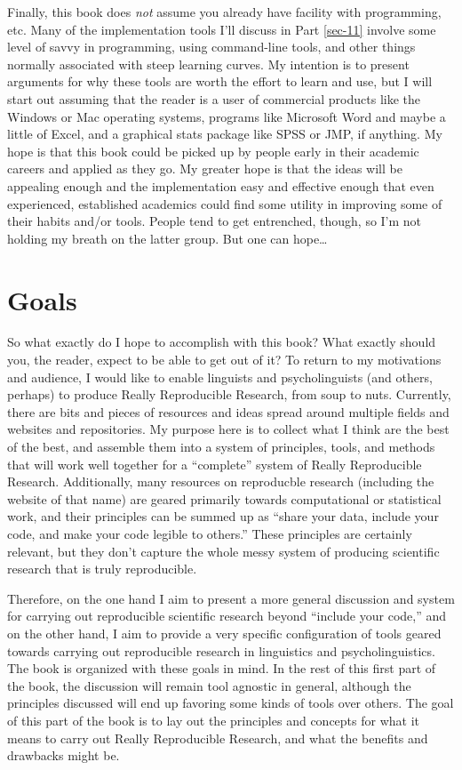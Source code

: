 \documentclass{book}
\begin{document}
Finally, this book does \emph{not} assume you already have facility with programming, etc. Many of the implementation tools I'll discuss in Part \ref{sec-11} involve some level of savvy in programming, using command-line tools, and other things normally associated with steep learning curves. My intention is to present arguments for why these tools are worth the effort to learn and use, but I will start out assuming that the reader is a user of commercial products like the Windows or Mac operating systems, programs like Microsoft Word and maybe a little of Excel, and a graphical stats package like SPSS or JMP, if anything.  My hope is that this book could be picked up by people early in their academic careers and applied as they go. My greater hope is that the ideas will be appealing enough and the implementation easy and effective enough that even experienced, established academics could find some utility in improving some of their habits and/or tools.  People tend to get entrenched, though, so I'm not holding my breath on the latter group.  But one can hope\ldots{}
\section{Goals}
\label{sec-2-5}

So what exactly do I hope to accomplish with this book?  What exactly should you, the reader, expect to be able to get out of it?  To return to my motivations and audience, I would like to enable linguists and psycholinguists (and others, perhaps) to produce Really Reproducible Research, from soup to nuts.  Currently, there are bits and pieces of resources and ideas spread around multiple fields and websites and repositories. My purpose here is to collect what I think are the best of the best, and assemble them into a system of principles, tools, and methods that will work well together for a ``complete'' system of Really Reproducible Research.  Additionally, many resources on reproducble research (including the website of that name) are geared primarily towards computational or statistical work, and their principles can be summed up as ``share your data, include your code, and make your code legible to others.'' These principles are certainly relevant, but they don't capture the whole messy system of producing scientific research that is truly reproducible.  

Therefore, on the one hand I aim to present a more general discussion and system for carrying out reproducible scientific research beyond ``include your code,'' and on the other hand, I aim to provide a very specific configuration of tools geared towards carrying out reproducible research in linguistics and psycholinguistics.  The book is organized with these goals in mind.  In the rest of this first part of the book, the discussion will remain tool agnostic in general, although the principles discussed will end up favoring some kinds of tools over others.  The goal of this part of the book is to lay out the principles and concepts for what it means to carry out Really Reproducible Research, and what the benefits and drawbacks might be.  
\end{document}
